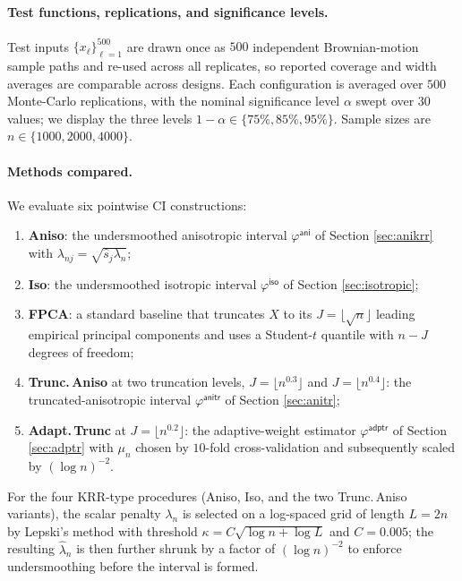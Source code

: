 \documentclass[11pt,a4paper]{article}
\renewcommand{\hat}{\widehat}
\theoremstyle{definition}
\theoremstyle{plain}
\theoremstyle{remark}
\newcommand{\iso}{\mathsf{iso}}
\newcommand{\ani}{\mathsf{ani}}
\newcommand{\anitr}{\mathsf{anitr}}
\newcommand{\adptr}{\mathsf{adptr}}
\begin{document}
\paragraph{Test functions, replications, and significance levels.}
Test inputs $\{x_\ell\}_{\ell=1}^{500}$ are drawn once as $500$ independent Brownian-motion sample paths and re-used across all replicates, so reported coverage and width averages are comparable across designs. Each configuration is averaged over $500$ Monte-Carlo replications, with the nominal significance level $\alpha$ swept over $30$ values; we display the three levels $1-\alpha\in\{75\%,85\%,95\%\}$. Sample sizes are $n\in\{1000,2000,4000\}$.

\paragraph{Methods compared.}
We evaluate six pointwise CI constructions:
\begin{enumerate}[label=(\roman*),leftmargin=2.2em]
\item \textbf{Aniso}: the undersmoothed anisotropic interval $\varphi^{\ani}$ of Section \ref{sec:anikrr} with $\lambda_{nj}=\sqrt{\hat s_j\lambda_n}$;
\item \textbf{Iso}: the undersmoothed isotropic interval $\varphi^{\iso}$ of Section \ref{sec:isotropic};
\item \textbf{FPCA}: a standard baseline that truncates $X$ to its $J=\lfloor\sqrt n\rfloor$ leading empirical principal components and uses a Student-$t$ quantile with $n-J$ degrees of freedom;
\item \textbf{Trunc.\,Aniso} at two truncation levels, $J=\lfloor n^{0.3}\rfloor$ and $J=\lfloor n^{0.4}\rfloor$: the truncated-anisotropic interval $\varphi^{\anitr}$ of Section \ref{sec:anitr};
\item \textbf{Adapt.\,Trunc} at $J=\lfloor n^{0.2}\rfloor$: the adaptive-weight estimator $\varphi^{\adptr}$ of Section \ref{sec:adptr} with $\mu_n$ chosen by $10$-fold cross-validation and subsequently scaled by $(\log n)^{-2}$.
\end{enumerate}
For the four KRR-type procedures (Aniso, Iso, and the two Trunc.\,Aniso variants), the scalar penalty $\lambda_n$ is selected on a log-spaced grid of length $L=2n$ by Lepski's method with threshold $\kappa=C\sqrt{\log n+\log L}$ and $C=0.005$; the resulting $\hat\lambda_n$ is then further shrunk by a factor of $(\log n)^{-2}$ to enforce undersmoothing before the interval is formed.
\end{document}
